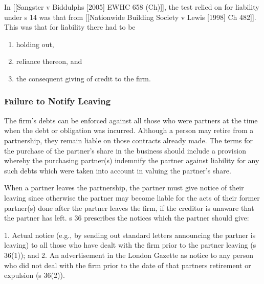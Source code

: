 \documentclass[
]{article}
\newenvironment{Shaded}{}{}
\newcommand{\NormalTok}[1]{#1}
\providecommand{\tightlist}{%
  \setlength{\itemsep}{0pt}\setlength{\parskip}{0pt}}
\begin{document}
In {[}{[}Sangster v Biddulphs {[}2005{]} EWHC 658 (Ch){]}{]}, the test
relied on for liability under s 14 was that from {[}{[}Nationwide
Building Society v Lewis {[}1998{]} Ch 482{]}{]}. This was that for
liability there had to be

\begin{enumerate}
\def\labelenumi{(\alph{enumi})}
\tightlist
\item
  holding out,\\
\item
  reliance thereon, and\\
\item
  the consequent giving of credit to the firm.
\end{enumerate}

\hypertarget{failure-to-notify-leaving}{%
\subsubsection{Failure to Notify
Leaving}\label{failure-to-notify-leaving}}

The firm's debts can be enforced against all those who were partners at
the time when the debt or obligation was incurred. Although a person may
retire from a partnership, they remain liable on those contracts already
made. The terms for the purchase of the partner's share in the business
should include a provision whereby the purchasing partner(s) indemnify
the partner against liability for any such debts which were taken into
account in valuing the partner's share.

\begin{Shaded}
\begin{Highlighting}[]
\NormalTok{When a partner leaves the partnership, the partner must give notice of their leaving since otherwise the partner may become liable for the acts of their former partner(s) done after the partner leaves the firm, if the creditor is unaware that the partner has left. s 36 prescribes the notices which the partner should give:}

\NormalTok{1. Actual notice (e.g., by sending out standard letters announcing the partner is leaving) to all those who have dealt with the firm prior to the partner leaving (s 36(1)); and}
\NormalTok{2. An advertisement in the London Gazette as notice to any person who did not deal with the firm prior to the date of that partner\textquotesingle{}s retirement or expulsion (s 36(2)).}
\end{Highlighting}
\end{Shaded}
\end{document}
